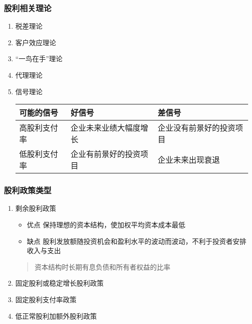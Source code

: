 \documentclass[11pt]{article}
\begin{document}
\subsubsection{股利相关理论}
\label{sec:orgcd9daf0}
\begin{enumerate}
\item 税差理论
\label{sec:org36927e3}
\item 客户效应理论
\label{sec:org0d4cadf}
\item ``一鸟在手''理论
\label{sec:org6c652a2}
\item 代理理论
\label{sec:orgdf441e5}
\item 信号理论
\label{sec:org99bd8e4}
\begin{center}
\begin{tabular}{lll}
可能的信号 & 好信号 & 差信号\\
\hline
高股利支付率 & 企业未来业绩大幅度增长 & 企业没有前景好的投资项目\\
低股利支付率 & 企业有前景好的投资项目 & 企业未来出现衰退\\
\end{tabular}
\end{center}
\end{enumerate}
\subsubsection{股利政策类型}
\label{sec:org0d85fef}
\begin{enumerate}
\item 剩余股利政策
\label{sec:orgae007c9}
\begin{itemize}
\item 优点
保持理想的资本结构，使加权平均资本成本最低
\item 缺点
股利发放额随投资机会和盈利水平的波动而波动，不利于投资者安排收入与支出
\end{itemize}
\begin{quote}
资本结构时长期有息负债和所有者权益的比率
\end{quote}
\item 固定股利或稳定增长股利政策
\label{sec:org37ab363}
\item 固定股利支付率政策
\label{sec:orgae0152d}
\item 低正常股利加额外股利政策
\label{sec:org41ef9f7}
\end{enumerate}
\end{document}
